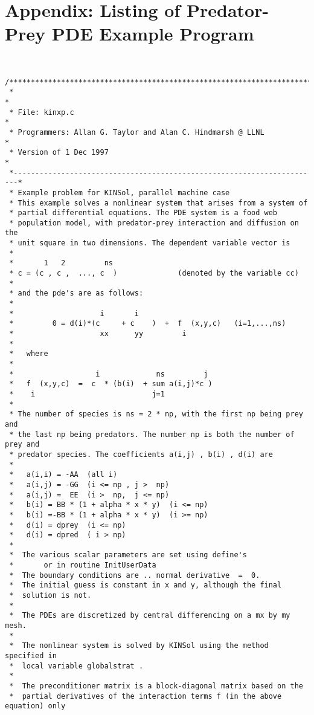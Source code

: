 \documentclass[11pt]{article}
\begin{document}
\section{Appendix: Listing of Predator-Prey PDE Example Program}
\small
\begin{verbatim}

 /************************************************************************
 *                                                                       *
 * File: kinxp.c                                                         *
 * Programmers: Allan G. Taylor and Alan C. Hindmarsh @ LLNL             *
 * Version of 1 Dec 1997                                                 *
 *-----------------------------------------------------------------------*
 * Example problem for KINSol, parallel machine case                  
 * This example solves a nonlinear system that arises from a system of  
 * partial differential equations. The PDE system is a food web         
 * population model, with predator-prey interaction and diffusion on the
 * unit square in two dimensions. The dependent variable vector is      
 * 
 *       1   2         ns
 * c = (c , c ,  ..., c  )              (denoted by the variable cc)
 * 
 * and the pde's are as follows:
 *
 *                    i       i      
 *         0 = d(i)*(c     + c    )  +  f  (x,y,c)   (i=1,...,ns)
 *                    xx      yy         i
 *
 *   where
 *
 *                   i             ns         j  
 *   f  (x,y,c)  =  c  * (b(i)  + sum a(i,j)*c )
 *    i                           j=1
 *
 * The number of species is ns = 2 * np, with the first np being prey and
 * the last np being predators. The number np is both the number of prey and
 * predator species. The coefficients a(i,j) , b(i) , d(i) are
 *
 *   a(i,i) = -AA  (all i)
 *   a(i,j) = -GG  (i <= np , j >  np)
 *   a(i,j) =  EE  (i >  np,  j <= np)
 *   b(i) = BB * (1 + alpha * x * y)  (i <= np)
 *   b(i) =-BB * (1 + alpha * x * y)  (i >= np)
 *   d(i) = dprey  (i <= np)
 *   d(i) = dpred  ( i > np)
 *
 *  The various scalar parameters are set using define's 
 *       or in routine InitUserData
 *  The boundary conditions are .. normal derivative  =  0.
 *  The initial guess is constant in x and y, although the final
 *  solution is not.
 *
 *  The PDEs are discretized by central differencing on a mx by my mesh.
 * 
 *  The nonlinear system is solved by KINSol using the method specified in
 *  local variable globalstrat .
 *
 *  The preconditioner matrix is a block-diagonal matrix based on the
 *  partial derivatives of the interaction terms f (in the above equation) only

\end{verbatim}
\end{document}
